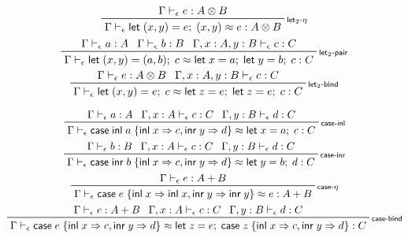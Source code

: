 \documentclass[acmsmall,screen,review]{acmart}
\newcommand{\ms}[1]{\ensuremath{\mathsf{#1}}}
\newcommand{\lto}{\Rightarrow}
\newcommand{\linl}[1]{\ms{inl}\;{#1}}
\newcommand{\linr}[1]{\ms{inr}\;{#1}}
\newcommand{\letexpr}[3]{\ensuremath{\ms{let}\;#1 = #2;\;#3}}
\newcommand{\caseexpr}[5]{\ms{case}\;#1\;\{\linl{#2} \lto #3, \linr{#4} \lto #5\}}
\newcommand{\bhyp}[2]{#1 : #2}
\newcommand{\rle}[1]{{\scriptsize\textsf{#1}}}
\newcommand{\hasty}[4]{#1 \vdash_{#2} #3: {#4}}
\newcommand{\teqv}{\approx}
\newcommand{\tmeq}[5]{#1 \vdash_{#2} #3 \teqv #4 : {#5}}
\begin{document}
\begin{gather*}
  \prftree[r]{\rle{let$_2$-$\eta$}}
    {\hasty{\Gamma}{\epsilon}{e}{A \otimes B}}
    {\tmeq{\Gamma}{\epsilon}{\letexpr{(x, y)}{e}{(x, y)}}{e}{A \otimes B}} 
  \\
  \prftree[r]{\rle{let$_2$-pair}}
    {\hasty{\Gamma}{\epsilon}{a}{A}}
    {\hasty{\Gamma}{\epsilon}{b}{B}}
    {\hasty{\Gamma, \bhyp{x}{A}, \bhyp{y}{B}}{\epsilon}{c}{C}}
    {\tmeq{\Gamma}{\epsilon}{\letexpr{(x, y)}{(a, b)}{c}}{\letexpr{x}{a}{\letexpr{y}{b}{c}}}{C}}
  \\
  \prftree[r]{\rle{let$_2$-bind}}
    {\hasty{\Gamma}{\epsilon}{e}{A \otimes B}}
    {\hasty{\Gamma, \bhyp{x}{A}, \bhyp{y}{B}}{\epsilon}{c}{C}}
    {\tmeq{\Gamma}{\epsilon}
      {\letexpr{(x, y)}{e}{c}}
      {\letexpr{z}{e}{\letexpr{z}{e}{c}}}{C}}
\end{gather*}

\begin{gather*}
  \prftree[r]{\rle{case-inl}}
    {\hasty{\Gamma}{\epsilon}{a}{A}}
    {\hasty{\Gamma, \bhyp{x}{A}}{\epsilon}{c}{C}}
    {\hasty{\Gamma, \bhyp{y}{B}}{\epsilon}{d}{C}}
    {\tmeq{\Gamma}{\epsilon}{\caseexpr{\linl{a}}{x}{c}{y}{d}}{\letexpr{x}{a}{c}}{C}}
  \\
  \prftree[r]{\rle{case-inr}}
    {\hasty{\Gamma}{\epsilon}{b}{B}}
    {\hasty{\Gamma, \bhyp{x}{A}}{\epsilon}{c}{C}}
    {\hasty{\Gamma, \bhyp{y}{B}}{\epsilon}{d}{C}}
    {\tmeq{\Gamma}{\epsilon}{\caseexpr{\linr{b}}{x}{c}{y}{d}}{\letexpr{y}{b}{d}}{C}}
  \\
  \prftree[r]{\rle{case-$\eta$}}
    {\hasty{\Gamma}{\epsilon}{e}{A + B}}
    {\tmeq{\Gamma}{\epsilon}{\caseexpr{e}{x}{\linl{x}}{y}{\linr{y}}}{e}{A + B}}
  \\
  \prftree[r]{\rle{case-bind}}
    {\hasty{\Gamma}{\epsilon}{e}{A + B}}
    {\hasty{\Gamma, \bhyp{x}{A}}{\epsilon}{c}{C}}
    {\hasty{\Gamma, \bhyp{y}{B}}{\epsilon}{d}{C}}
    {\tmeq{\Gamma}{\epsilon}{\caseexpr{e}{x}{c}{y}{d}}{\letexpr{z}{e}{\caseexpr{z}{x}{c}{y}{d}}}{C}}
\end{gather*}
\end{document}
